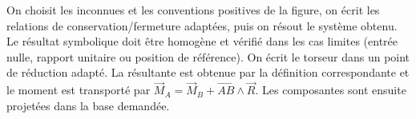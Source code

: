 \begin{corrigebox}
On choisit les inconnues et les conventions positives de la figure,
        on écrit les relations de conservation/fermeture adaptées, puis on résout le
        système obtenu. Le résultat symbolique doit être homogène et vérifié dans les cas
        limites (entrée nulle, rapport unitaire ou position de référence).
On écrit le torseur dans un point de réduction adapté. La résultante
        est obtenue par la définition correspondante et le moment est transporté par
        $\vec M_A=\vec M_B+\overrightarrow{AB}\wedge\vec R$. Les composantes sont ensuite
        projetées dans la base demandée.
\end{corrigebox}
